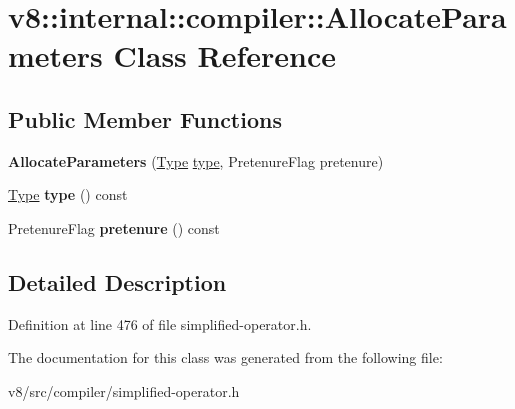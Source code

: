 \hypertarget{classv8_1_1internal_1_1compiler_1_1AllocateParameters}{}\section{v8\+:\+:internal\+:\+:compiler\+:\+:Allocate\+Parameters Class Reference}
\label{classv8_1_1internal_1_1compiler_1_1AllocateParameters}
\subsection*{Public Member Functions}
\begin{DoxyCompactItemize}
\item 
\mbox{\label{classv8_1_1internal_1_1compiler_1_1AllocateParameters_a5c74f2e1cb46e3a77829b43edd98e4f6}} 
{\bfseries Allocate\+Parameters} (\mbox{\hyperlink{classv8_1_1internal_1_1compiler_1_1Type}{Type}} \mbox{\hyperlink{classstd_1_1conditional_1_1type}{type}}, Pretenure\+Flag pretenure)
\item 
\mbox{\label{classv8_1_1internal_1_1compiler_1_1AllocateParameters_aba76eb976aec806239fb817076397362}} 
\mbox{\hyperlink{classv8_1_1internal_1_1compiler_1_1Type}{Type}} {\bfseries type} () const
\item 
\mbox{\label{classv8_1_1internal_1_1compiler_1_1AllocateParameters_a445c1add5bb6605923c17e76ec741ad7}} 
Pretenure\+Flag {\bfseries pretenure} () const
\end{DoxyCompactItemize}


\subsection{Detailed Description}


Definition at line 476 of file simplified-\/operator.\+h.



The documentation for this class was generated from the following file\+:\begin{DoxyCompactItemize}
\item 
v8/src/compiler/simplified-\/operator.\+h\end{DoxyCompactItemize}
